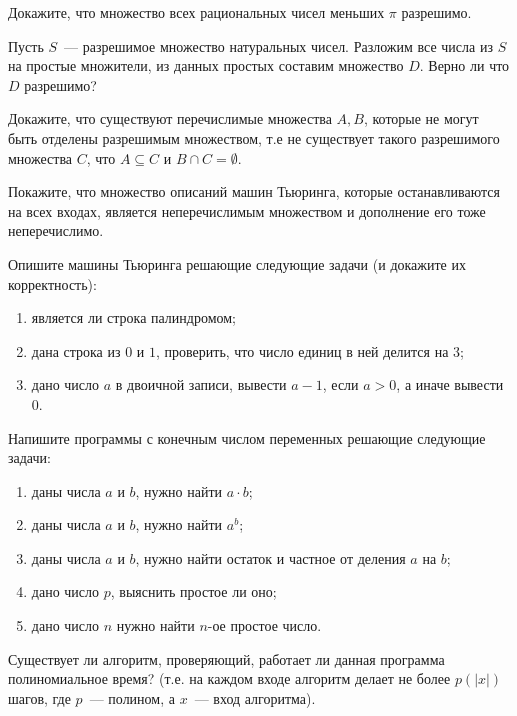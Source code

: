 
\begin{task}
    Докажите, что множество всех рациональных чисел меньших $\pi$ разрешимо.
\end{task}

\begin{task}
    Пусть $S$~--- разрешимое множество натуральных чисел. Разложим все числа из $S$ на простые множители, из данных простых
    составим множество $D$. Верно ли что $D$ разрешимо?
\end{task}

\begin{task}
    Докажите, что существуют перечислимые множества $A, B$, которые не могут быть отделены разрешимым множеством, т.е не
	существует такого разрешимого множества $C$, что $A \subseteq C$ и $B \cap C = \emptyset$.
\end{task}


\begin{task}
    Покажите, что множество описаний машин Тьюринга, которые останавливаются на всех входах, является неперечислимым множеством и
    дополнение его тоже неперечислимо.
\end{task}


\begin{task}
	Опишите машины Тьюринга решающие следующие задачи (и докажите их корректность):
	\begin{enumerate}
		\item является ли строка палиндромом;
		\item дана строка из $0$ и $1$, проверить, что число единиц в ней делится на $3$;
		\item дано число $a$ в двоичной записи, вывести $a - 1$, если $a > 0$, а иначе вывести $0$.
	\end{enumerate}
\end{task}

\begin{task}
	Напишите программы с конечным числом переменных решающие следующие задачи:
	\begin{enumerate}
		\item даны числа $a$ и $b$, нужно найти $a \cdot b$;
		\item даны числа $a$ и $b$, нужно найти $a^b$;
		\item даны числа $a$ и $b$, нужно найти остаток и частное от деления $a$ на $b$;
		\item дано число $p$, выяснить простое ли оно;
		\item дано число $n$ нужно найти $n$-ое простое число.
	\end{enumerate}
\end{task}


\breakline

\begin{ptask}{9}
    Существует ли алгоритм, проверяющий, работает ли данная программа полиномиальное время? (т.е. на каждом входе алгоритм делает
    не более $p(|x|)$ шагов, где $p$~--- полином, а $x$~--- вход алгоритма).
\end{ptask}
